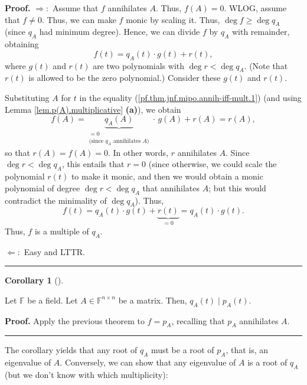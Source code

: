 \documentclass[numbers=enddot,12pt,final,onecolumn,notitlepage]{scrartcl}%
\numberwithin{exer}{subsection}
\theoremstyle{definition}
\newtheorem{coro}[theo]{Corollary}
\newenvironment{corollary}[1][]
{\begin{coro}[#1]\begin{leftbar}}
{\end{leftbar}\end{coro}}
\newenvironment{proof}[1][Proof]{\noindent\textbf{#1.} }{\ \rule{0.5em}{0.5em}}
\begin{document}
\begin{proof}
$\Longrightarrow:$ Assume that $f$ annihilates $A$. Thus, $f\left(  A\right)
=0$. WLOG, assume that $f\neq0$. Thus, we can make $f$ monic by scaling it.
Thus, $\deg f\geq\deg q_{A}$ (since $q_{A}$ had minimum degree). Hence, we can
divide $f$ by $q_{A}$ with remainder, obtaining%
\begin{equation}
f\left(  t\right)  =q_{A}\left(  t\right)  \cdot g\left(  t\right)  +r\left(
t\right)  , \label{pf.thm.jnf.mipo.annih-iff-mult.1}%
\end{equation}
where $g\left(  t\right)  $ and $r\left(  t\right)  $ are two polynomials with
$\deg r<\deg q_{A}$. (Note that $r\left(  t\right)  $ is allowed to be the
zero polynomial.) Consider these $g\left(  t\right)  $ and $r\left(  t\right)
$.

Substituting $A$ for $t$ in the equality
(\ref{pf.thm.jnf.mipo.annih-iff-mult.1}) (and using Lemma
\ref{lem.p(A).multiplicative} \textbf{(a)}), we obtain%
\[
f\left(  A\right)  =\underbrace{q_{A}\left(  A\right)  }%
_{\substack{=0\\\text{(since }q_{A}\text{ annihilates }A\text{)}}%
}\cdot\,g\left(  A\right)  +r\left(  A\right)  =r\left(  A\right)  ,
\]
so that $r\left(  A\right)  =f\left(  A\right)  =0$. In other words, $r$
annihilates $A$. Since $\deg r<\deg q_{A}$, this entails that $r=0$ (since
otherwise, we could scale the polynomial $r\left(  t\right)  $ to make it
monic, and then we would obtain a monic polynomial of degree $\deg r<\deg
q_{A}$ that annihilates $A$; but this would contradict the minimality of $\deg
q_{A}$). Thus,%
\[
f\left(  t\right)  =q_{A}\left(  t\right)  \cdot g\left(  t\right)
+\underbrace{r\left(  t\right)  }_{=0}=q_{A}\left(  t\right)  \cdot g\left(
t\right)  .
\]
Thus, $f$ is a multiple of $q_{A}$. \medskip

$\Longleftarrow:$ Easy and LTTR.
\end{proof}

\begin{corollary}
\label{cor.jnf.mipo.div-charpol}Let $\mathbb{F}$ be a field. Let
$A\in\mathbb{F}^{n\times n}$ be a matrix. Then, $q_{A}\left(  t\right)  \mid
p_{A}\left(  t\right)  $.
\end{corollary}

\begin{proof}
Apply the previous theorem to $f=p_{A}$, recalling that $p_{A}$ annihilates
$A$.
\end{proof}

The corollary yields that any root of $q_{A}$ must be a root of $p_{A}$, that
is, an eigenvalue of $A$. Conversely, we can show that any eigenvalue of $A$
is a root of $q_{A}$ (but we don't know with which multiplicity):
\end{document}
